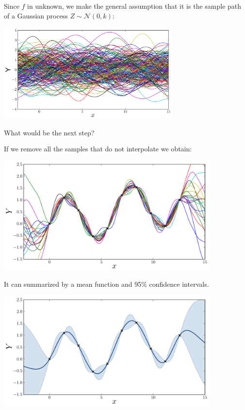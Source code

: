 \begin{frame}{}
Since $f$ in unknown, we make the general assumption that
it is the sample path of a Gaussian process $Z \sim \mathcal{N}(0,k)$:
\begin{center}
\includegraphics[height=5cm]{1_stat_models/figures/R/Fig1b-sim}
\end{center}
What would be the next step?
\end{frame}

\begin{frame}{}
If we remove all the samples that do not interpolate we obtain:
\begin{center}
\includegraphics[height=6cm]{1_stat_models/figures/R/Fig1-sim-cond}
\end{center}
\end{frame}

\begin{frame}{}
It can summarized by a mean function and 95\% confidence intervals.
\begin{center}
\includegraphics[height=6cm]{1_stat_models/figures/R/Fig1-GP}
\end{center}
\end{frame}

